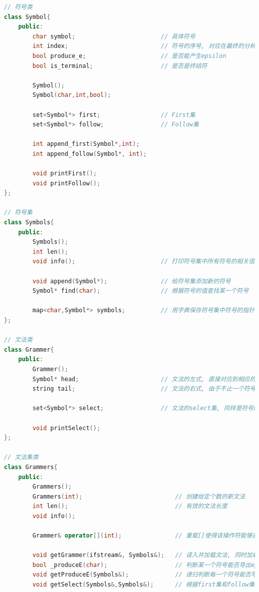 \documentclass{zpt}
\begin{document}
    \begin{lstlisting}[language=c++]
// 符号类
class Symbol{
    public:
        char symbol;                        // 具体符号
        int index;                          // 符号的序号, 对应在最终的分析表中的行号/列号
        bool produce_e;                     // 是否能产生epsilon
        bool is_terminal;                   // 是否是终结符

        Symbol();
        Symbol(char,int,bool);

        set<Symbol*> first;                 // First集
        set<Symbol*> follow;                // Follow集

        int append_first(Symbol*,int);
        int append_follow(Symbol*, int);

        void printFirst();
        void printFollow();
};

// 符号集
class Symbols{
    public:
        Symbols();
        int len();
        void info();                        // 打印符号集中所有符号的相关信息

        void append(Symbol*);               // 给符号集添加新的符号
        Symbol* find(char);                 // 根据符号的值查找某一个符号

        map<char,Symbol*> symbols;          // 用字典保存符号集中符号的指针
};

// 文法类
class Grammer{
    public:
        Grammer();
        Symbol* head;                       // 文法的左式, 直接对应到相应的符号
        string tail;                        // 文法的右式, 由于不止一个符号, 因此还是用字符串保存符号的值

        set<Symbol*> select;                // 文法的select集, 同样是符号的指针

        void printSelect();
};

// 文法集类
class Grammers{
    public:
        Grammers();
        Grammers(int);                          // 创建给定个数的新文法
        int len();                              // 有效的文法长度
        void info();

        Grammer& operator[](int);               // 重载[]使得该操作符能够直接访问其grammer成员

        void getGrammer(ifstream&, Symbols&);   // 读入并加载文法, 同时加载非终结符到Symbols中
        bool _produceE(char);                   // 判断某一个符号能否导出epsilon的子函数
        void getProduceE(Symbols&);             // 递归判断每一个符号能否导出epsilon
        void getSelect(Symbols&,Symbols&);      // 根据first集和follow集计算select集, 存在各个文法中


\end{lstlisting}
\end{document}
